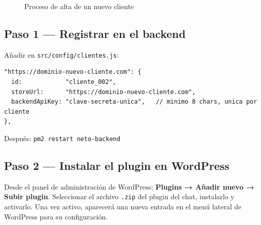 \documentclass[12pt, a4paper]{article}
\begin{document}
\begin{figure}[h]
\centering
{}
\caption{Proceso de alta de un nuevo cliente}
\end{figure}

\subsection{Paso 1 --- Registrar en el backend}

Añadir en \texttt{src/config/clientes.js}:

\begin{lstlisting}[style=js]
"https://dominio-nuevo-cliente.com": {
  id:            "cliente_002",
  storeUrl:      "https://dominio-nuevo-cliente.com",
  backendApiKey: "clave-secreta-unica",   // minimo 8 chars, unica por cliente
},
\end{lstlisting}

Después: \texttt{pm2 restart neto-backend}

\subsection{Paso 2 --- Instalar el plugin en WordPress}

Desde el panel de administración de WordPress: \textbf{Plugins → Añadir nuevo → Subir plugin}. Seleccionar el archivo \texttt{.zip} del plugin del chat, instalarlo y activarlo. Una vez activo, aparecerá una nueva entrada en el menú lateral de WordPress para su configuración.
\end{document}
